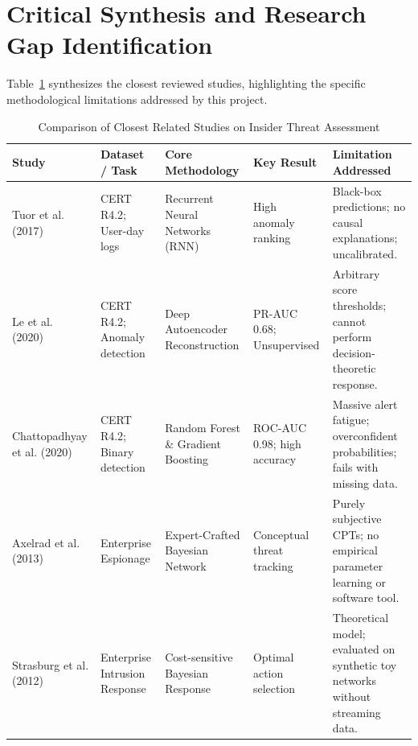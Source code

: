 \documentclass[12pt,a4paper]{report}
\begin{document}
\section{Critical Synthesis and Research Gap Identification}
Table~\ref{tab:lit_comparison} synthesizes the closest reviewed studies, highlighting the specific methodological limitations addressed by this project.

\begin{table}[H]
\centering
\caption{Comparison of Closest Related Studies on Insider Threat Assessment}
\label{tab:lit_comparison}
\fontsize{9}{12}\selectfont
\begin{tabularx}{\textwidth}{p{} p{} p{} p{} X}
\toprule
\textbf{Study} & \textbf{Dataset / Task} & \textbf{Core Methodology} & \textbf{Key Result} & \textbf{Limitation Addressed} \\
\midrule
Tuor et al. (2017)~\cite{tuor2017deep} & CERT R4.2; User-day logs & Recurrent Neural Networks (RNN) & High anomaly ranking & Black-box predictions; no causal explanations; uncalibrated. \\
\addlinespace
Le et al. (2020)~\cite{le2020deep} & CERT R4.2; Anomaly detection & Deep Autoencoder Reconstruction & PR-AUC 0.68; Unsupervised & Arbitrary score thresholds; cannot perform decision-theoretic response. \\
\addlinespace
Chattopadhyay et al. (2020)~\cite{chattopadhyay2020time} & CERT R4.2; Binary detection & Random Forest \& Gradient Boosting & ROC-AUC 0.98; high accuracy & Massive alert fatigue; overconfident probabilities; fails with missing data. \\
\addlinespace
Axelrad et al. (2013)~\cite{axelrad2013bayesian} & Enterprise Espionage & Expert-Crafted Bayesian Network & Conceptual threat tracking & Purely subjective CPTs; no empirical parameter learning or software tool. \\
\addlinespace
Strasburg et al. (2012)~\cite{strasburg2012bayesian} & Enterprise Intrusion Response & Cost-sensitive Bayesian Response & Optimal action selection & Theoretical model; evaluated on synthetic toy networks without streaming data. \\
\bottomrule
\end{tabularx}
\end{table}
\end{document}
